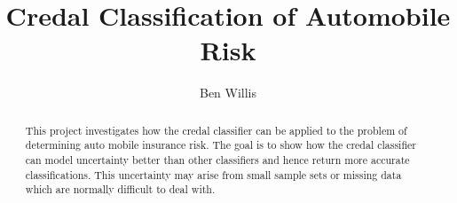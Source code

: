 \documentclass[11pt]{report}
\begin{document}
\title{Credal Classification of Automobile Risk}
\author{Ben Willis}
\maketitle

\begin{abstract}
	This project investigates how the credal classifier can be applied to the problem of determining auto mobile insurance risk. The goal is to show how the credal classifier can model uncertainty better than other classifiers and hence return more accurate classifications. This uncertainty may arise from small sample sets or missing data which are normally difficult to deal with.
\end{abstract}

\tableofcontents






\end{document}
